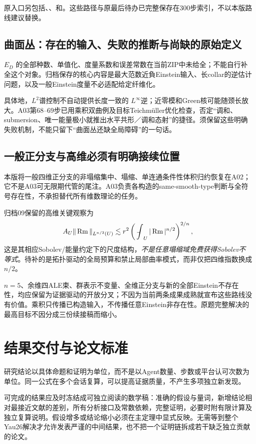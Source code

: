 \documentclass[UTF8,a4paper,11pt,fontset=fandol]{ctexart}
\numberwithin{equation}{section}
\theoremstyle{definition}
\newcommand{\Rm}{\operatorname{Rm}}
\newcommand{\fint}{\mathop{\rlap{\,\raisebox{0.1ex}{\tiny$-$}}\int}\nolimits}
\begin{document}
原入口另包括、、和。这些路径与原最后待办已完整保存在300步索引，不以本版路线建议替换。

\subsection{曲面丛：存在的输入、失败的推断与尚缺的原始定义}
$E_D$ 的全部种数、单值化、度量系数和误差常数在当前ZIP中未给全；不能自行补全这个对象。归档保存的核心内容是最大范数近負Einstein输入、长collar的逆估计问题，以及一般Einstein度量不必适配给定纤维化。

具体地，$L^2$谱控制不自动提供长度一致的 $L^\infty$逆；近零模和Green核可能随颈长放大。A03第68--69步已用乘积双曲例及目标Teichm\"uller优化检查，否定“调和、submersion、唯一能量极小就推出水平共形／调和态射”的捷径。须保留这些明确失败机制，不能只留下“曲面丛还缺全局障碍”的一句话。

\subsection{一般正分支与高维必须有明确接续位置}
本版将一般四维正分支的非塌缩集中、塌缩、单连通条件性体积归约恢复在A02；它不是A03可无限期代管的尾注。A03负责各构造的same-smooth-type判断与全符号存在性，不承担替代所有维数理论的任务。

归档09保留的高维关键观察为
\[
A_U\|\Rm\|_{L^{n/2}(U)}\lesssim r^2
\left(\fint_U|\Rm|^{n/2}\right)^{2/n},
\]
这是其相应Sobolev/能量约定下的尺度结构，\emph{不是任意塌缩域免费获得Sobolev不等式}。待补的是拓扑驱动的全局预算和禁止局部曲率模式，而非仅把四维指数换成 $n/2$。

$n=5$、余维四ALE束、群表示不变量、全维正分支与新的全部Einstein不存在性，均应保留为证据驱动的开放分叉；不因为当前两条成果成熟就宣布这些路线没有价值。乘积只传播已构造输入，不传播任意Einstein非存在性。原题完整解决的最高目标不因分成三份续接稿而缩小。

\section{结果交付与论文标准}
研究结论以具体命题和证明为单位，而不是以Agent数量、步数或平台认可次数为单位。同一公式在多个会话复算，可以提高证据质量，不产生多项独立新发现。

可完成的结果应及时冻结成可独立阅读的数学稿：准确的假设与量词，新增结论相对最接近文献的差别，所有分析接口及常数依赖，完整证明，必要时附有限计算及独立复算说明。假设增多或结论缩小必须在主定理中显式反映。无需等到整个Yau26解决才允许发表严谨的中间结果，也不把一个证明链拆成若干缺乏独立贡献的论文。
\end{document}
